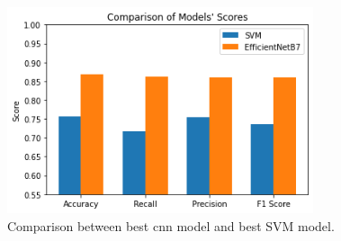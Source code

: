 \documentclass[12pt]{diazessay}
\begin{document}
    \begin{figure}[htp]
        \centering
        \includegraphics[width=9cm]{charts/EfficientNetB7_VS_SVM.png}
        \caption[Comparison between EfficientNet-B7 and SVM]{Comparison between best cnn model and best SVM model.}
        \label{fig:EfficientNetB7VsSVM}
    \end{figure} 

    \newpage
\end{document}
